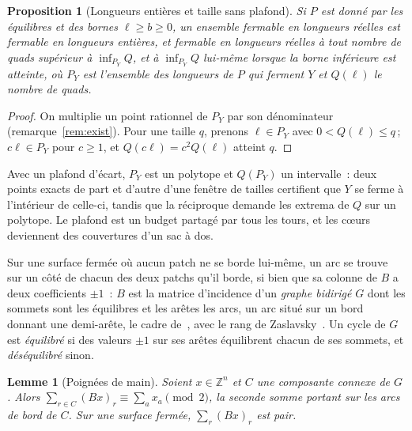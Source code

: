 \documentclass[11pt,a4paper]{article}
\newtheorem{proposition}{Proposition}
\newtheorem{lemma}{Lemme}
\newcommand{\Z}{\mathbb{Z}}
\newcommand{\lean}[1]{\texttt{\detokenize{#1}}}
\newenvironment{evidence}[3][]{}{}
\begin{document}
\begin{evidence}{core}{\lean{closable_at_any_size}, \lean{smul_mem_system}, \lean{whole_solution_of_real}\,; supposé~: le nombre de quads est homogène de degré deux en les longueurs\,; la borne inférieure est prise sur papier}
\begin{proposition}[Longueurs entières et taille sans plafond]\label{prop:whole-size}
Si $P$ est donné par les équilibres et des bornes $\ell \ge b \ge 0$, un
ensemble fermable en longueurs réelles est fermable en longueurs entières, et
fermable en longueurs réelles à tout nombre de quads supérieur à $\inf_{P_Y}
Q$, et à $\inf_{P_Y} Q$ lui-même lorsque la borne inférieure est atteinte, où
$P_Y$ est l'ensemble des longueurs de $P$ qui ferment $Y$ et $Q(\ell)$ le
nombre de quads.
\end{proposition}
\end{evidence}

\begin{proof}
On multiplie un point rationnel de $P_Y$ par son dénominateur
(remarque~\ref{rem:exist}). Pour une taille $q$, prenons $\ell \in P_Y$ avec
$0 < Q(\ell) \le q$\,; $c\ell \in P_Y$ pour $c \ge 1$, et $Q(c\ell) = c^2
Q(\ell)$ atteint $q$.
\end{proof}

Avec un plafond d'écart, $P_Y$ est un polytope et $Q(P_Y)$ un intervalle~:
deux points exacts de part et d'autre d'une fenêtre de tailles certifient que
$Y$ se ferme à l'intérieur de celle-ci, tandis que la réciproque demande les
extrema de $Q$ sur un polytope. Le plafond est un budget partagé par tous les
tours, et les cœurs deviennent des couvertures d'un sac à dos.

Sur une surface fermée où aucun patch ne se borde lui-même, un arc se trouve
sur un côté de chacun des deux patchs qu'il borde, si bien que sa colonne de
$B$ a deux coefficients $\pm1$~: $B$ est la matrice d'incidence d'un
\emph{graphe bidirigé} $G$ dont les sommets sont les équilibres et les arêtes
les arcs, un arc situé sur un bord donnant une demi-arête, le cadre
de~\cite{heistermann2023bimdf}, avec le rang de
Zaslavsky~\cite[th.~5.1(j), \S8A, th.~8B.1]{zaslavsky1982signed}. Un cycle de $G$ est \emph{équilibré} si
des valeurs $\pm1$ sur ses arêtes équilibrent chacun de ses sommets, et
\emph{déséquilibré} sinon.

\begin{evidence}{core}{\lean{TMesh.handshake}, \lean{handshake}, \lean{no_whole_solution}\,; supposé~: une surface fermée}
\begin{lemma}[Poignées de main]\label{lem:handshake}
Soient $x \in \Z^n$ et $C$ une composante connexe de $G$. Alors $\sum_{r \in
C} (Bx)_r \equiv \sum_{a} x_a \pmod 2$, la seconde somme portant sur les arcs
de bord de $C$. Sur une surface fermée, $\sum_r (Bx)_r$ est pair.
\end{lemma}
\end{evidence}
\end{document}
